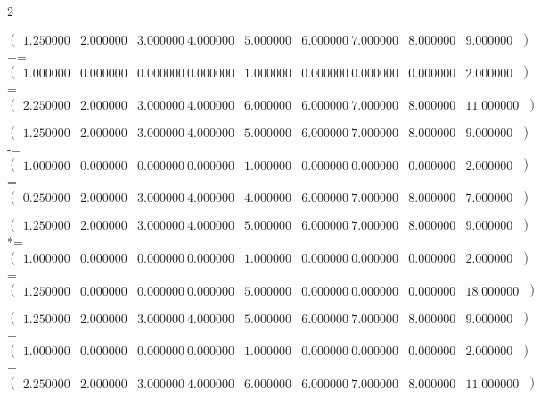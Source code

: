 2

$\begin{pmatrix}
1.250000 & 2.000000 & 3.000000\
4.000000 & 5.000000 & 6.000000\
7.000000 & 8.000000 & 9.000000\
\end{pmatrix}$ += 
$\begin{pmatrix}
1.000000 & 0.000000 & 0.000000\
0.000000 & 1.000000 & 0.000000\
0.000000 & 0.000000 & 2.000000\
\end{pmatrix}$ = 
$\begin{pmatrix}
2.250000 & 2.000000 & 3.000000\
4.000000 & 6.000000 & 6.000000\
7.000000 & 8.000000 & 11.000000\
\end{pmatrix}$

$\begin{pmatrix}
1.250000 & 2.000000 & 3.000000\
4.000000 & 5.000000 & 6.000000\
7.000000 & 8.000000 & 9.000000\
\end{pmatrix}$ -= 
$\begin{pmatrix}
1.000000 & 0.000000 & 0.000000\
0.000000 & 1.000000 & 0.000000\
0.000000 & 0.000000 & 2.000000\
\end{pmatrix}$ = 
$\begin{pmatrix}
0.250000 & 2.000000 & 3.000000\
4.000000 & 4.000000 & 6.000000\
7.000000 & 8.000000 & 7.000000\
\end{pmatrix}$

$\begin{pmatrix}
1.250000 & 2.000000 & 3.000000\
4.000000 & 5.000000 & 6.000000\
7.000000 & 8.000000 & 9.000000\
\end{pmatrix}$ *= 
$\begin{pmatrix}
1.000000 & 0.000000 & 0.000000\
0.000000 & 1.000000 & 0.000000\
0.000000 & 0.000000 & 2.000000\
\end{pmatrix}$ = 
$\begin{pmatrix}
1.250000 & 0.000000 & 0.000000\
0.000000 & 5.000000 & 0.000000\
0.000000 & 0.000000 & 18.000000\
\end{pmatrix}$

$\begin{pmatrix}
1.250000 & 2.000000 & 3.000000\
4.000000 & 5.000000 & 6.000000\
7.000000 & 8.000000 & 9.000000\
\end{pmatrix}$ + 
$\begin{pmatrix}
1.000000 & 0.000000 & 0.000000\
0.000000 & 1.000000 & 0.000000\
0.000000 & 0.000000 & 2.000000\
\end{pmatrix}$ = 
$\begin{pmatrix}
2.250000 & 2.000000 & 3.000000\
4.000000 & 6.000000 & 6.000000\
7.000000 & 8.000000 & 11.000000\
\end{pmatrix}$

